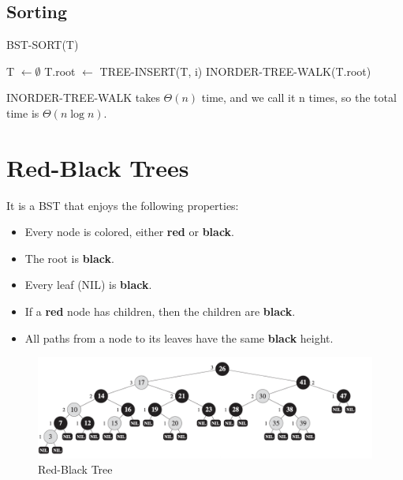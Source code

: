\subsection*{Sorting}

\begin{algorithm}[H]
    \caption{BST-SORT(T)}
    \begin{algorithmic}[1]
        \State T $\gets \emptyset$
            \State T.root $\gets$ TREE-INSERT(T, i)
        \EndFor
        \State INORDER-TREE-WALK(T.root)
        \State {}
    \end{algorithmic}
\end{algorithm}

INORDER-TREE-WALK takes $\Theta(n)$ time, and we call it n times, so the total time is $\Theta(n \log n)$.

\section{Red-Black Trees}

It is a BST that enjoys the following properties:
\begin{itemize}
    \item Every node is colored, either \textbf{red} or \textbf{black}.
    \item The root is \textbf{black}.
    \item Every leaf (NIL) is \textbf{black}.
    \item If a \textbf{red} node has children, then the children are \textbf{black}.
    \item All paths from a node to its leaves have the same \textbf{black} height.
\end{itemize}

\begin{figure}[H]
    \centering 
    \includegraphics[width = \textwidth]{assets/RBT.png}
    \caption{Red-Black Tree}
\end{figure}


